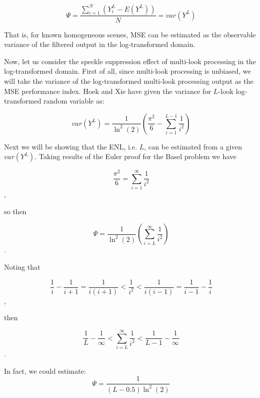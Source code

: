 \documentclass[journal]{IEEEtran}
\begin{document}
\begin{equation}
\Psi = \frac{ \sum^N_{i=1}{ (Y^L_i - E(Y^L)) } }{N} = var(Y^L)
\end{equation}

That is, for known homogeneous scenes, MSE can be estimated as the observable variance of the filtered output in the log-transformed domain.

Now, let us consider the speckle suppression effect of multi-look processing in the log-transformed domain. 
First of all, since multi-look processing is unbiased, we will take the variance of the log-transformed multi-look processing output as the MSE performance index. 
Hoek \cite{Hoekman_1991_TGRS} and Xie \cite{Xie_2002_TGRS} have given the variance for $L$-look log-transformed random variable as: 

\begin{equation}
var(Y^L)= \frac{1}{\ln^2(2)} \left( \frac{\pi^2}{6} - \sum^{L-1}_{i=1}{\frac{1}{i^2}} \right)
\end{equation}

Next we will be showing that the ENL, i.e. $L$, can be estimated from a given $var(Y^L)$. 
Taking results of the Euler proof for the Basel problem we have 

\begin{equation}
\frac{\pi^2}{6} = \sum^{\infty}_{i=1}{ \frac{1}{i^2} }
\end{equation},

so then 

\begin{equation}
\Psi= \frac{1}{\ln^2(2)} \left( \sum^{\infty}_{i=L}{ \frac{1}{i^2} } \right)
\end{equation}.

Noting that 

\begin{equation}
\frac{1}{i} - \frac{1}{i+1} = \frac{1}{i(i+1)} < \frac{1}{i^2} < \frac{1}{i(i-1)} = \frac{1}{i-1} - \frac{1}{i}
\end{equation}, 

then 

\begin{equation}
\frac{1}{L} - \frac{1}{\infty} < \sum^{\infty}_{i=L}{ \frac{1}{i^2} }  < \frac{1}{L-1} - \frac{1}{\infty}
\end{equation}.

In fact, we could estimate:
\begin{equation}
  \Psi = \frac{1}{(L-0.5) \ln^2(2) }
\label{eqn:perf_index_analytic}
\end{equation}
\end{document}
